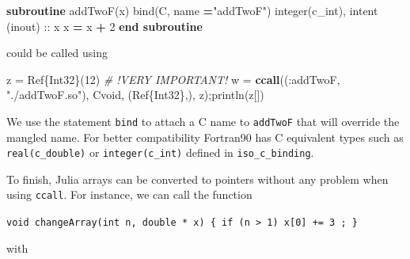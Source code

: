\documentclass[11pt]{article}
\newenvironment{Shaded}{}{}
\newcommand{\KeywordTok}[1]{\textcolor[rgb]{0.00,0.44,0.13}{\textbf{{#1}}}}
\newcommand{\DataTypeTok}[1]{\textcolor[rgb]{0.56,0.13,0.00}{{#1}}}
\newcommand{\DecValTok}[1]{\textcolor[rgb]{0.25,0.63,0.44}{{#1}}}
\newcommand{\FloatTok}[1]{\textcolor[rgb]{0.25,0.63,0.44}{{#1}}}
\newcommand{\StringTok}[1]{\textcolor[rgb]{0.25,0.44,0.63}{{#1}}}
\newcommand{\CommentTok}[1]{\textcolor[rgb]{0.38,0.63,0.69}{\textit{{#1}}}}
\newcommand{\NormalTok}[1]{{#1}}
\newcommand{\OperatorTok}[1]{\textcolor[rgb]{0.40,0.40,0.40}{{#1}}}
\begin{document}
\begin{Shaded}
\begin{Highlighting}[]
\KeywordTok{subroutine}\NormalTok{ addTwoF(x) bind(C, name }\KeywordTok{=}\StringTok{"addTwoF"}\NormalTok{)}
    \DataTypeTok{integer(c\_int)}\NormalTok{, }\DataTypeTok{intent (inout)} \DataTypeTok{::}\NormalTok{ x}
\NormalTok{    x }\KeywordTok{=}\NormalTok{ x }\KeywordTok{+} \DecValTok{2}
  \KeywordTok{end subroutine} 
\end{Highlighting}
\end{Shaded}

could be called using

\begin{Shaded}
\begin{Highlighting}[]
\NormalTok{z }\OperatorTok{=} \DataTypeTok{Ref}\NormalTok{\{}\DataTypeTok{Int32}\NormalTok{\}(}\FloatTok{12}\NormalTok{) }\CommentTok{\# !VERY IMPORTANT!}
\NormalTok{w }\OperatorTok{=} \KeywordTok{ccall}\NormalTok{((}\OperatorTok{:}\NormalTok{addTwoF}\OperatorTok{,} \StringTok{"./addTwoF.so"}\NormalTok{)}\OperatorTok{,}\NormalTok{ Cvoid}\OperatorTok{,}\NormalTok{ (}\DataTypeTok{Ref}\NormalTok{\{}\DataTypeTok{Int32}\NormalTok{\}}\OperatorTok{,}\NormalTok{)}\OperatorTok{,}\NormalTok{ z)}\OperatorTok{;}\NormalTok{println(}\NormalTok{z[])}
\end{Highlighting}
\end{Shaded}

We use the statement \texttt{bind} to attach a C name to \texttt{addTwoF}
that will override the mangled name. For better compatibility Fortran90 has C equivalent types
such as \texttt{real(c\_double)} or \texttt{integer(c\_int)} defined in \texttt{iso\_c\_binding}.

To finish, Julia arrays can be converted to pointers without any problem when using \texttt{ccall}.
For instance, we can call the function 

\texttt{void\ changeArray(int\ n,\ double\ *\ x)\ \{\ if\ (n\ \textgreater{}\ 1)\ x{[}0{]}\ +=\ 3\ ;\ \}}

with
\begin{Shaded}
\end{Shaded}
\end{document}
